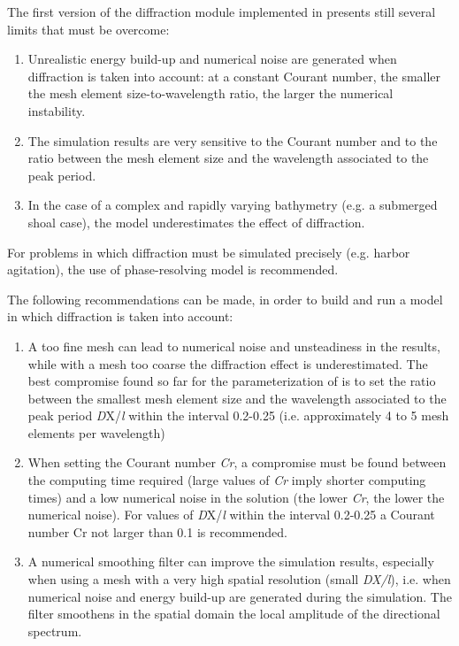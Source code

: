  The first version of the diffraction module implemented in \tomawac presents still several limits that must be overcome:

\begin{enumerate}
\item  Unrealistic energy build-up and numerical noise are generated when diffraction is taken into account: at a constant Courant number, the smaller the mesh element size-to-wavelength ratio, the larger the numerical instability.

\item  The simulation results are very sensitive to the Courant number and to the ratio between the mesh element size and the wavelength associated to the peak period.

\item  In the case of a complex and rapidly varying bathymetry (e.g. a submerged shoal case), the model underestimates the effect of diffraction.
\end{enumerate}

 For problems in which diffraction must be simulated precisely (e.g. harbor agitation), the use of phase-resolving model is recommended.

 The following recommendations can be made, in order to build and run a \tomawac model in which diffraction is taken into account:

\begin{enumerate}
\item  A too fine mesh can lead to numerical noise and unsteadiness in the results, while with a mesh too coarse the diffraction effect is underestimated. The best compromise found so far for the parameterization of \tomawac is to set the ratio between the smallest mesh element size and the wavelength associated to the peak period \textit{D}X/\textit{l} within the interval 0.2-0.25 (i.e. approximately 4 to 5 mesh elements per wavelength)

\item  When setting the Courant number \textit{Cr}, a compromise must be found between the computing time required (large values of \textit{Cr} imply shorter computing times) and a low numerical noise in the solution (the lower \textit{Cr}, the lower the numerical noise). For values of \textit{D}X/\textit{l} within the interval 0.2-0.25 a Courant number Cr not larger than 0.1 is recommended.

\item  A numerical smoothing filter can improve the simulation results, especially when using a mesh with a very high spatial resolution (small \textit{DX/l}), i.e. when numerical noise and energy build-up are generated during the simulation. The filter smoothens in the spatial domain the local amplitude of the directional spectrum.
\end{enumerate}


